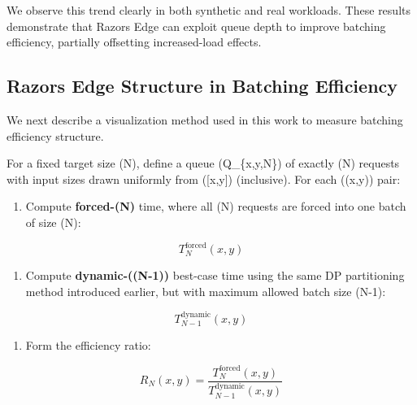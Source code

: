 \documentclass{article}
\providecommand{\tightlist}{\setlength{\itemsep}{0pt}\setlength{\parskip}{0pt}}
\begin{document}
We observe this trend clearly in both synthetic and real workloads.
These results demonstrate that Razor\textquotesingle s Edge can exploit
queue depth to improve batching efficiency, partially offsetting
increased-load effects.

\hypertarget{76-razors-edge-structure-in-batching-efficiency}{%
\subsection{Razor\textquotesingle s Edge Structure in Batching
Efficiency}\label{76-razors-edge-structure-in-batching-efficiency}}

We next describe a visualization method used in this work to measure
batching efficiency structure.

For a fixed target size (N), define a queue (Q\_\{x,y,N\}) of exactly
(N) requests with input sizes drawn uniformly from ({[}x,y{]})
(inclusive). For each ((x,y)) pair:

\begin{enumerate}
\def\labelenumi{\arabic{enumi}.}
\tightlist
\item
  Compute \textbf{forced-(N)} time, where all (N) requests are forced
  into one batch of size (N):
\end{enumerate}

\begin{equation}
T^{\mathrm{forced}}_N(x,y)
\end{equation}

\begin{enumerate}
\def\labelenumi{\arabic{enumi}.}
\setcounter{enumi}{1}
\tightlist
\item
  Compute \textbf{dynamic-((N-1))} best-case time using the same DP
  partitioning method introduced earlier, but with maximum allowed batch
  size (N-1):
\end{enumerate}

\begin{equation}
T^{\mathrm{dynamic}}_{N-1}(x,y)
\end{equation}

\begin{enumerate}
\def\labelenumi{\arabic{enumi}.}
\setcounter{enumi}{2}
\tightlist
\item
  Form the efficiency ratio:
\end{enumerate}

\begin{equation}
R_N(x,y)=\frac{T^{\mathrm{forced}}_N(x,y)}{T^{\mathrm{dynamic}}_{N-1}(x,y)}
\end{equation}
\end{document}
